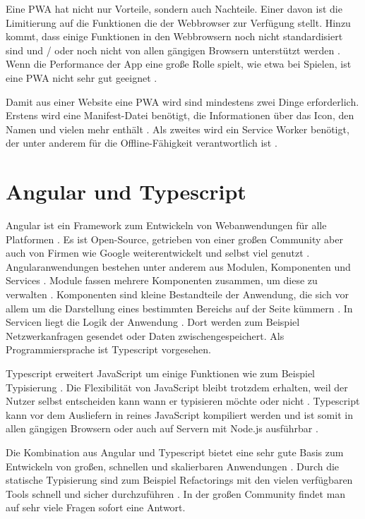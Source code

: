Eine \ac{PWA} hat nicht nur Vorteile, sondern auch Nachteile. Einer davon ist die Limitierung auf die Funktionen die der Webbrowser zur Verfügung stellt. Hinzu kommt, dass einige Funktionen in den Webbrowsern noch nicht standardisiert sind und / oder noch nicht von allen gängigen Browsern unterstützt werden \autocite{majchrzak2018} \autocite{biorn2017}. Wenn die Performance der App eine große Rolle spielt, wie etwa bei Spielen, ist eine \ac{PWA} nicht sehr gut geeignet \autocite{biorn2017}.

Damit aus einer Website eine \ac{PWA} wird sind mindestens zwei Dinge erforderlich. Erstens wird eine Manifest-Datei benötigt, die Informationen über das Icon, den Namen und vielen mehr enthält \autocite{Hajian2019} \autocite{Rojas2020}. Als zweites wird ein Service Worker benötigt, der unter anderem für die Offline-Fähigkeit verantwortlich ist \autocite{Rojas2020}. 


\section{Angular und Typescript}
Angular ist ein Framework zum Entwickeln von Webanwendungen für alle Platformen \autocite{angular-io}. Es ist Open-Source, getrieben von einer großen Community aber auch von Firmen wie Google weiterentwickelt und selbst viel genutzt \autocite{angular-io}. Angularanwendungen bestehen unter anderem aus Modulen, Komponenten und Services \autocite{angular-start}. Module fassen mehrere Komponenten zusammen, um diese zu verwalten \autocite{angular-start}. Komponenten sind kleine Bestandteile der Anwendung, die sich vor allem um die Darstellung eines bestimmten Bereichs auf der Seite kümmern \autocite{angular-start}. In Servicen liegt die Logik der Anwendung \autocite{angular-start}. Dort werden zum Beispiel Netzwerkanfragen gesendet oder Daten zwischengespeichert. Als Programmiersprache ist Typescript vorgesehen. 

Typescript erweitert JavaScript um einige Funktionen wie zum Beispiel Typisierung \autocite{typescript-org}. Die Flexibilität von JavaScript bleibt trotzdem erhalten, weil der Nutzer selbst entscheiden kann wann er typisieren möchte oder nicht \autocite{typescript-org}. Typescript kann vor dem Ausliefern in reines JavaScript kompiliert werden und ist somit in allen gängigen Browsern oder auch auf Servern mit Node.js ausführbar \autocite{typescript-org}.

Die Kombination aus Angular und Typescript bietet eine sehr gute Basis zum Entwickeln von großen, schnellen und skalierbaren Anwendungen \autocite{angular-io}. Durch die statische Typisierung sind zum Beispiel Refactorings mit den vielen verfügbaren Tools schnell und sicher durchzuführen \autocite{typescript-org} \autocite{angular-io}. In der großen Community findet man auf sehr viele Fragen sofort eine Antwort.

